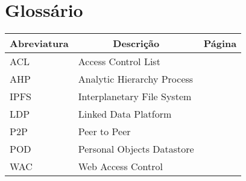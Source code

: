 

\chapter[Glossary]{Glossário}

\begin{center}
\small
\begin{longtable}{lp{3.0in}c}
\toprule \multicolumn{1}{c}{Abreviatura}
                & \multicolumn{1}{c}{Descrição}
                                & \multicolumn{1}{c}{Página}\\ \midrule\addlinespace[2pt] \endhead

\bottomrule\endfoot

ACL & Access Control List & \pageref{sym:ACL} \\
AHP & Analytic Hierarchy Process & \pageref{sym:AHP} \\
IPFS & Interplanetary File System & \pageref{sym:IPFS} \\
LDP & Linked Data Platform & \pageref{sym:LDP} \\
P2P & Peer to Peer & \pageref{sym:P2P} \\
POD & Personal Objects Datastore & \pageref{sym:POD} \\
WAC & Web Access Control & \pageref{sym:WAC}

\end{longtable}

\end{center}

